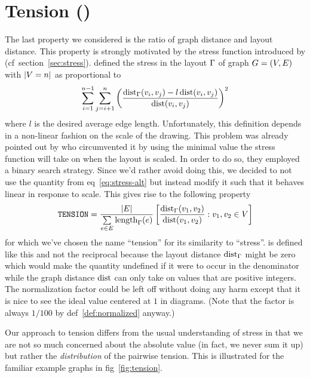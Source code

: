 \documentclass{graphstudy}
\begin{document}
\section{Tension ()}
\label{sec:tension}

The last property we considered is the ratio of graph distance and layout distance.  This property is strongly motivated
by the stress function introduced by \textcite{Kamada1989} (\acs{cf}~\acs{section}~\ref{sec:stress}).
\citeauthor{Kamada1989} defined the stress in the layout \(\Gamma\) of graph \(G=(V,E)\) with \(\left\lvert\relax{V}=n\right\rvert\)
as proportional to
\begin{equation}
  \label{eq:stress-alt}%
  \sum_{i=1}^{n-1} \sum_{j=i+1}^{n}
  \left(\frac{\dist_\Layout(v_i,v_j)-l\dist(v_i,v_j)}{\dist(v_i,v_j)}\right)^2
\end{equation}
where \(l\) is the desired average edge length.  Unfortunately, this definition depends in a non-linear fashion on the
scale of the drawing.  This problem was already pointed out by \textcite{Welch2017} who circumvented it by using the
minimal value the stress function will take on when the layout is scaled.  In order to do so, they employed a binary
search strategy.  Since we'd rather avoid doing this, we decided to not use the quantity from
\acl{eq}~\ref{eq:stress-alt} but instead modify it such that it behaves linear in response to scale.  This gives rise
to the following property
\begin{equation}
  \mbox{\text{\upshape\ttfamily TENSION}} =
  \frac{\left\lvert E\right\rvert}{\sum\limits_{e\in E}\operatorname{length}_\Gamma(e)}
  \left[\frac{\operatorname{dist}_\Gamma(v_1,v_2)}{\operatorname{dist}(v_1,v_2)}:{}v_1,v_2\in V\right]
\end{equation}
for which we've chosen the name \enquote{tension} for its similarity to \enquote{stress}.   is defined
like this and not the reciprocal because the layout distance \(\operatorname{dist}_\Gamma\) might be zero which would make the
quantity undefined if it were to occur in the denominator while the graph distance \(\operatorname{dist}\) can only take on values
that are positive integers.  The normalization factor could be left off without doing any harm except that it is nice to
see the ideal value centered at \(1\) in diagrams.  (Note that the factor is always \(1/100\) by
\acl{def}~\ref{def:normalized} anyway.)

Our approach to tension differs from the usual understanding of stress in that we are not so much concerned about the
absolute value (in fact, we never sum it up) but rather the \emph{distribution} of the pairwise tension.  This is
illustrated for the familiar example graphs in \acl{fig}~\ref{fig:tension}.
\end{document}
